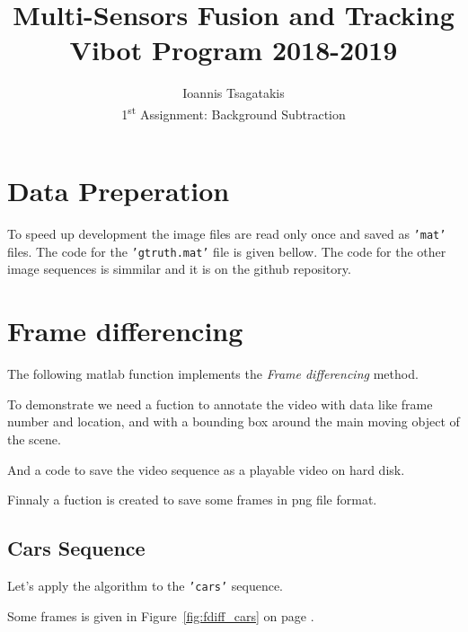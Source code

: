 \documentclass[a4paper,12pt]{article}
\begin{document}
\title{ Multi-Sensors Fusion and Tracking\\Vibot Program 2018-2019}
\author{Ioannis Tsagatakis\\
1\textsuperscript{st} Assignment: Background Subtraction} 
 
\maketitle

\section{Data Preperation}
To speed up development the image files are read only once and saved as \texttt{'mat'} files. The code for the \texttt{'gtruth.mat'} file is given bellow. The code for the other image sequences is simmilar and it is on the github repository.



\section{Frame differencing}
The following matlab function implements the \textit{Frame differencing} method.



To demonstrate we need a fuction to annotate the video with data like frame number and location, and with a bounding box around the main moving object of the scene.



And a code to save the video sequence as a playable video on hard disk.



Finnaly a fuction is created to save some frames in png file format.


\subsection{Cars Sequence}
Let's apply the algorithm to the \texttt{'cars'} sequence.


Some frames is given in Figure~\ref{fig:fdiff_cars} on page \pageref{fig:fdiff_cars}.
\end{document}
